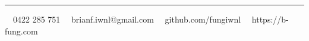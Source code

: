 \documentclass[11pt,letterpaper]{article}
\begin{document}
\hrule
\vspace{-1em}
\begin{center}
	\vspace{0.8cm}
	\raisebox{-0.2\height} {\Large \faPhoneSquare} \ \  0422 285 751 \hfill\raisebox{-0.2\height}{\Large \faEnvelopeSquare} \ \ brianf.iwnl@gmail.com \hfill \raisebox{-0.2\height}{\Large \faGithubSquare} \ \ github.com/fungiwnl \hfill \raisebox{-0.2\height}{\Large \faGlobe} \ \ https://b-fung.com
\end{center}
\end{document}
